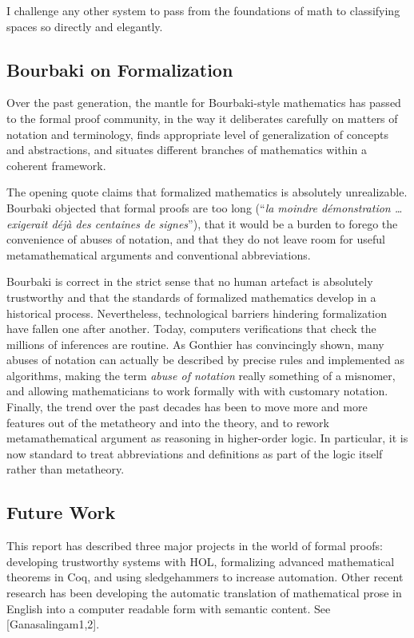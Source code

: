 \documentclass[brochure,english,12pt]{bourbaki}
\theoremstyle{plain}
\begin{document}
I challenge any other system to pass from the foundations of math to classifying spaces so directly and elegantly.



\subsection{Bourbaki on Formalization}

Over the past generation, the mantle for Bourbaki-style mathematics has  passed to the formal proof community, in the way it
 deliberates carefully on matters of notation and terminology, finds
appropriate level of generalization of concepts and abstractions, and
situates different branches of mathematics within a coherent framework.

The opening quote claims that formalized mathematics is absolutely unrealizable.
Bourbaki objected that formal proofs are too long (``{\it la moindre d\'emonstration \ldots
exigerait d\'ej\`a des centaines de signes}''), that it would be a burden to forego 
the convenience of abuses of notation, and that they do not leave room for useful metamathematical
arguments and conventional abbreviations.

Bourbaki is correct in the strict sense that no human artefact is absolutely trustworthy and that
the standards of formalized mathematics develop in a historical process.
Nevertheless,  technological barriers hindering formalization have fallen one
after another.  Today, computers verifications that
check the millions of inferences are routine.
As Gonthier has convincingly shown, 
many abuses of notation can actually be described by precise rules and implemented as algorithms,
making the term {\it abuse of notation} really something of a misnomer, and
allowing mathematicians to work formally with with customary notation.
Finally, the 
trend over the past decades has been to move more and more features out of the metatheory and into the theory, and to
rework metamathematical argument as reasoning in higher-order logic.  In particular, it is now
standard to treat abbreviations and definitions as part of the logic itself rather than metatheory.

\subsection{Future Work}

This report has described three major projects in the world of formal proofs:
developing trustworthy systems with HOL, formalizing advanced mathematical theorems
in Coq, and using sledgehammers to increase automation.   
Other recent research has been developing  the automatic translation of mathematical prose in English
into a computer readable form with semantic content.  See [Ganasalingam1,2].
\end{document}
